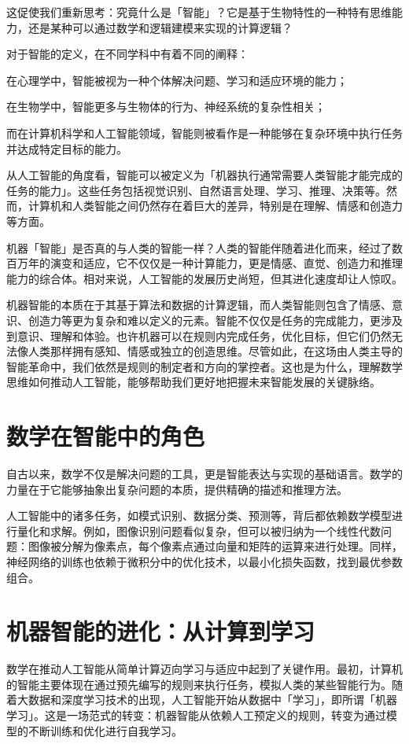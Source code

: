 这促使我们重新思考：究竟什么是「智能」？它是基于生物特性的一种特有思维能力，还是某种可以通过数学和逻辑建模来实现的计算逻辑？

对于智能的定义，在不同学科中有着不同的阐释：

在心理学中，智能被视为一种个体解决问题、学习和适应环境的能力；

在生物学中，智能更多与生物体的行为、神经系统的复杂性相关；

而在计算机科学和人工智能领域，智能则被看作是一种能够在复杂环境中执行任务并达成特定目标的能力。

从人工智能的角度看，智能可以被定义为「机器执行通常需要人类智能才能完成的任务的能力」。这些任务包括视觉识别、自然语言处理、学习、推理、决策等。然而，计算机和人类智能之间仍然存在着巨大的差异，特别是在理解、情感和创造力等方面。

机器「智能」是否真的与人类的智能一样？人类的智能伴随着进化而来，经过了数百万年的演变和适应，它不仅仅是一种计算能力，更是情感、直觉、创造力和推理能力的综合体。相对来说，人工智能的发展历史尚短，但其进化速度却让人惊叹。

机器智能的本质在于其基于算法和数据的计算逻辑，而人类智能则包含了情感、意识、创造力等更为复杂和难以定义的元素。智能不仅仅是任务的完成能力，更涉及到意识、理解和体验。也许机器可以在规则内完成任务，优化目标，但它们仍然无法像人类那样拥有感知、情感或独立的创造思维。尽管如此，在这场由人类主导的智能革命中，我们依然是规则的制定者和方向的掌控者。这也是为什么，理解数学思维如何推动人工智能，能够帮助我们更好地把握未来智能发展的关键脉络。

\section{数学在智能中的角色}

自古以来，数学不仅是解决问题的工具，更是智能表达与实现的基础语言。数学的力量在于它能够抽象出复杂问题的本质，提供精确的描述和推理方法。

人工智能中的诸多任务，如模式识别、数据分类、预测等，背后都依赖数学模型进行量化和求解。例如，图像识别问题看似复杂，但可以被归纳为一个线性代数问题：图像被分解为像素点，每个像素点通过向量和矩阵的运算来进行处理。同样，神经网络的训练也依赖于微积分中的优化技术，以最小化损失函数，找到最优参数组合。

\section{机器智能的进化：从计算到学习}

数学在推动人工智能从简单计算迈向学习与适应中起到了关键作用。最初，计算机的智能主要体现在通过预先编写的规则来执行任务，模拟人类的某些智能行为。随着大数据和深度学习技术的出现，人工智能开始从数据中「学习」，即所谓「机器学习」。这是一场范式的转变：机器智能从依赖人工预定义的规则，转变为通过模型的不断训练和优化进行自我学习。

